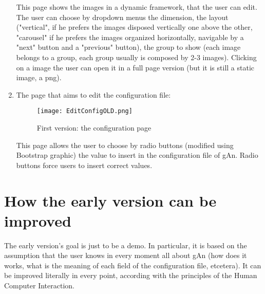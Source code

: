 \begin{enumerate}
This page shows the images in a dynamic framework, that the user can edit.
The user can choose by dropdown menus the dimension, the layout ("vertical", if he prefers the images disposed vertically one above the other, "carousel" if he prefers the images organized horizontally, navigable by a "next" button and a "previous" button), the group to show (each image belongs to a group, each group usually is composed by 2-3 images). Clicking on a image the user can open it in a full page version (but it is still a static image, a png).


\item The page that aims to edit the configuration file:

\begin{figure}[H]
\centering
\texttt{[image: EditConfigOLD.png]}  
\caption{First version: the configuration page}
\end{figure}   

This page allows the user to choose by radio buttons (modified using Bootstrap graphic) the value to insert in the configuration file of gAn. Radio buttons force users to insert correct values.    

\end{enumerate}

\section{How the early version can be improved}
The early version's goal is just to be a demo. In particular, it is based on the assumption that the user knows in every moment all about gAn (how does it works,  what is the meaning of each field of the configuration file, etcetera). It can be improved literally in every point, according with the principles of the Human Computer Interaction.

